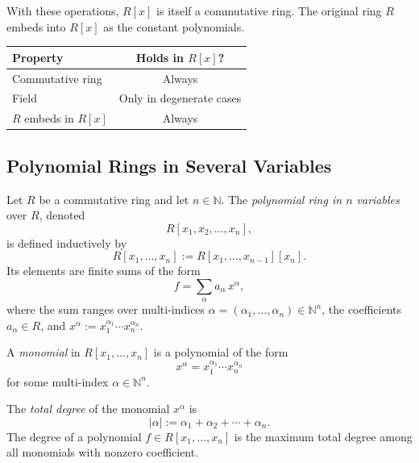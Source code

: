 \begin{remark}
With these operations, $R[x]$ is itself a commutative ring.
The original ring $R$ embeds into $R[x]$ as the constant polynomials.

\begin{center}
\begin{tabular}{l|c}
Property & Holds in $R[x]$? \\
\hline
Commutative ring & Always \\
Field & Only in degenerate cases \\
$R$ embeds in $R[x]$ & Always
\end{tabular}
\end{center}
\end{remark}

\subsection{Polynomial Rings in Several Variables}

\begin{definition}
Let $R$ be a commutative ring and let $n \in \mathbb{N}$.
The \emph{polynomial ring in $n$ variables} over $R$, denoted
\[
R[x_1, x_2, \dots, x_n],
\]
is defined inductively by
\[
R[x_1, \dots, x_n] := R[x_1, \dots, x_{n-1}][x_n].
\]
Its elements are finite sums of the form
\[
f = \sum_{\alpha} a_\alpha \, x^\alpha,
\]
where the sum ranges over multi-indices
$\alpha = (\alpha_1, \dots, \alpha_n) \in \mathbb{N}^n$,
the coefficients $a_\alpha \in R$, and
$x^\alpha := x_1^{\alpha_1} \cdots x_n^{\alpha_n}$.
\end{definition}

\begin{definition}[Monomial]
A \emph{monomial} in $R[x_1, \dots, x_n]$ is a polynomial
of the form
\[
x^\alpha = x_1^{\alpha_1} \cdots x_n^{\alpha_n}
\]
for some multi-index $\alpha \in \mathbb{N}^n$.
\end{definition}

\begin{definition}
The \emph{total degree} of the monomial $x^\alpha$ is
\[
|\alpha| := \alpha_1 + \alpha_2 + \cdots + \alpha_n.
\]
The degree of a polynomial $f \in R[x_1,\dots,x_n]$ is
the maximum total degree among all monomials with nonzero coefficient.
\end{definition}

